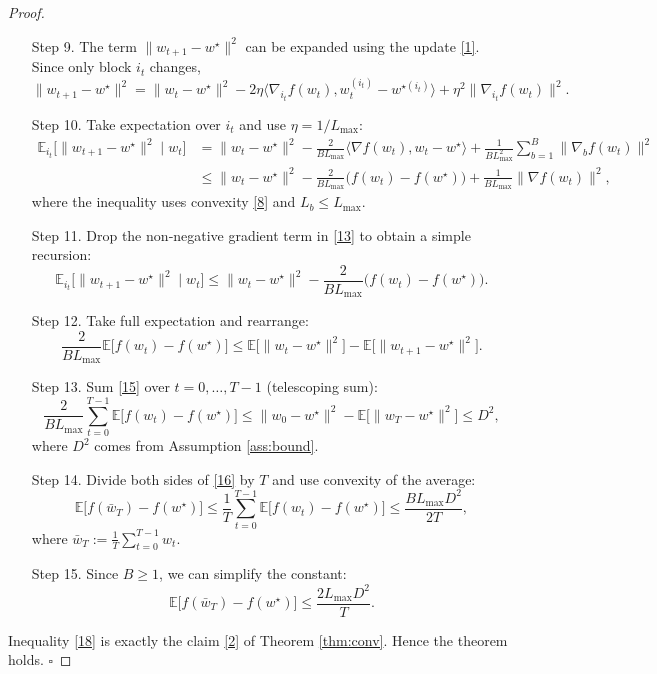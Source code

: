 \documentclass{article}
\newcommand{\E}{\mathbb{E}}
\begin{document}
\begin{proof}
\begin{enumerate}
\item[Step 9.]  The term $\|w_{t+1}-w^{\star}\|^{2}$ can be expanded using the update
\eqref{1}.  Since only block $i_{t}$ changes,
\[
\|w_{t+1}-w^{\star}\|^{2}
= \|w_{t}-w^{\star}\|^{2}
   -2\eta\langle \nabla_{i_{t}}f(w_{t}),w_{t}^{(i_{t})}-w^{\star (i_{t})}\rangle
   +\eta^{2}\|\nabla_{i_{t}}f(w_{t})\|^{2}.
\tag{12}
\]

\item[Step 10.]  Take expectation over $i_{t}$ and use $\eta=1/L_{\max}$:
\[
\begin{aligned}
\E_{i_{t}}\!\big[\|w_{t+1}-w^{\star}\|^{2}\mid w_{t}\big]
&= \|w_{t}-w^{\star}\|^{2}
   -\frac{2}{B L_{\max}}\langle \nabla f(w_{t}),w_{t}-w^{\star}\rangle
   +\frac{1}{B L_{\max}^{2}}\sum_{b=1}^{B}\|\nabla_{b}f(w_{t})\|^{2}\\
&\le \|w_{t}-w^{\star}\|^{2}
   -\frac{2}{B L_{\max}}\big(f(w_{t})-f(w^{\star})\big)
   +\frac{1}{B L_{\max}}\|\nabla f(w_{t})\|^{2},
\end{aligned}
\tag{13}
\]
where the inequality uses convexity \eqref{8} and $L_{b}\le L_{\max}$.

\item[Step 11.]  Drop the non‑negative gradient term in \eqref{13} to obtain a
simple recursion:
\[
\E_{i_{t}}\!\big[\|w_{t+1}-w^{\star}\|^{2}\mid w_{t}\big]
\le \|w_{t}-w^{\star}\|^{2}
   -\frac{2}{B L_{\max}}\big(f(w_{t})-f(w^{\star})\big).
\tag{14}
\]

\item[Step 12.]  Take full expectation and rearrange:
\[
\frac{2}{B L_{\max}}\E\!\big[f(w_{t})-f(w^{\star})\big]
\le \E\!\big[\|w_{t}-w^{\star}\|^{2}\big]
   -\E\!\big[\|w_{t+1}-w^{\star}\|^{2}\big].
\tag{15}
\]

\item[Step 13.]  Sum \eqref{15} over $t=0,\dots ,T-1$ (telescoping sum):
\[
\frac{2}{B L_{\max}}\sum_{t=0}^{T-1}\E\!\big[f(w_{t})-f(w^{\star})\big]
\le \|w_{0}-w^{\star}\|^{2}-\E\!\big[\|w_{T}-w^{\star}\|^{2}\big]
\le D^{2},
\tag{16}
\]
where $D^{2}$ comes from Assumption \ref{ass:bound}.

\item[Step 14.]  Divide both sides of \eqref{16} by $T$ and use convexity of the
average:
\[
\E\!\big[f(\bar w_{T})-f(w^{\star})\big]
\le\frac{1}{T}\sum_{t=0}^{T-1}\E\!\big[f(w_{t})-f(w^{\star})\big]
\le\frac{B L_{\max}D^{2}}{2T},
\tag{17}
\]
where $\bar w_{T}:=\frac{1}{T}\sum_{t=0}^{T-1} w_{t}$.

\item[Step 15.]  Since $B\ge 1$, we can simplify the constant:
\[
\E\!\big[f(\bar w_{T})-f(w^{\star})\big]\le\frac{2L_{\max}D^{2}}{T}.
\tag{18}
\]

\end{enumerate}
Inequality \eqref{18} is exactly the claim \eqref{2} of Theorem
\ref{thm:conv}.  Hence the theorem holds.  $\square$
\end{proof}
\end{document}
